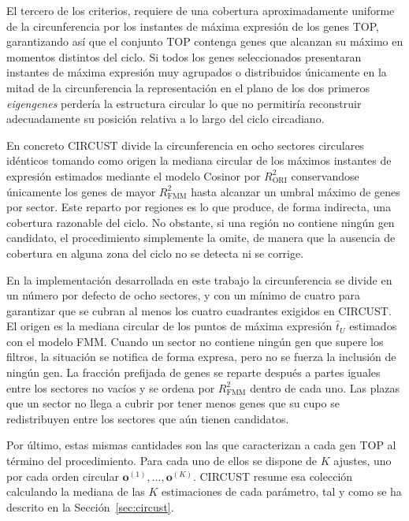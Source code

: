 \documentclass[12pt, a4paper]{report}
\begin{document}
El tercero de los criterios, requiere de una cobertura aproximadamente uniforme de la circunferencia por los instantes de máxima expresión de los genes TOP, garantizando así que el conjunto TOP contenga genes que alcanzan su máximo en momentos distintos del ciclo. Si todos los genes seleccionados presentaran instantes de máxima expresión muy agrupados o distribuidos únicamente en la mitad de la circunferencia la representación en el plano de los dos primeros \emph{eigengenes} perdería la estructura circular lo que no permitiría reconstruir adecuadamente su posición relativa a lo largo del ciclo circadiano.

En concreto CIRCUST divide la circunferencia en ocho sectores circulares idénticos tomando como origen la mediana circular de los máximos instantes de expresión estimados mediante el modelo Cosinor por \(R^2_{\mathrm{ORI}}\) conservandose únicamente los genes de mayor \(R^2_{\mathrm{FMM}}\) hasta alcanzar un umbral máximo de genes por sector. Este reparto por regiones es lo que produce, de forma indirecta, una cobertura razonable del ciclo. No obstante, si una región no contiene ningún gen candidato, el procedimiento simplemente la omite, de manera que la ausencia de cobertura en alguna zona del ciclo no se detecta ni se corrige.

En la implementación desarrollada en este trabajo la circunferencia se divide en un número por defecto de ocho sectores, y con un mínimo de cuatro para garantizar que se cubran al menos los cuatro cuadrantes exigidos en CIRCUST. El origen es la mediana circular de los puntos de máxima expresión \(\widehat{t}_U\) estimados con el modelo FMM. Cuando un sector no contiene ningún gen que supere los filtros, la situación se notifica de forma expresa, pero no se fuerza la inclusión de ningún gen. La fracción prefijada de genes se reparte después a partes iguales entre los sectores no vacíos y se ordena por \(R^2_{\mathrm{FMM}}\) dentro de cada uno. Las plazas que un sector no llega a cubrir por tener menos genes que su cupo se redistribuyen entre los sectores que aún tienen candidatos.

Por último, estas mismas cantidades son las que caracterizan a cada gen TOP al término del procedimiento. Para cada uno de ellos se dispone de \(K\) ajustes, uno por cada orden circular \(\mathbf{o}^{(1)},\ldots,\mathbf{o}^{(K)}\). CIRCUST resume esa colección calculando la mediana de las \(K\) estimaciones de cada parámetro, tal y como se ha descrito en la Sección~\ref{sec:circust}.
\end{document}

